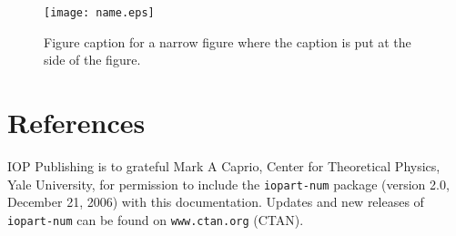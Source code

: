 \documentclass[a4paper]{jpconf}
\begin{document}
\begin{figure}[h]
\texttt{[image: name.eps]}\hspace{2pc}%
\begin{minipage}[b]{14pc}\caption{\label{label}Figure caption for a narrow figure where the caption is put at the side of the figure.}
\end{minipage}
\end{figure}


\section*{References}
\begin{thebibliography}{9}
 IOP Publishing is to grateful Mark A Caprio, Center for Theoretical Physics, Yale University, for permission to include the {\tt iopart-num} \BibTeX package (version 2.0, December 21, 2006) with  this documentation. Updates and new releases of {\tt iopart-num} can be found on \verb"www.ctan.org" (CTAN). 
\end{thebibliography}
\end{document}
